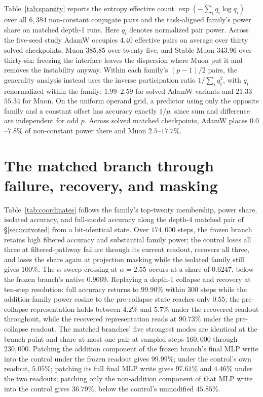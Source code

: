 Table~\ref{tab:sparsity} reports the entropy effective count $\exp(-\sum_i q_i\log q_i)$ over all $6{,}384$ non-constant conjugate pairs and the task-aligned family's power share on matched depth-1 runs. Here $q_i$ denotes normalized pair power. Across the five-seed study AdamW occupies $4.40$ effective pairs on average over thirty solved checkpoints, Muon $385.85$ over twenty-five, and Stable Muon $343.96$ over thirty-six: freezing the interface leaves the dispersion where Muon put it and removes the instability anyway. Within each family's $(p-1)/2$ pairs, the generality analysis instead uses the inverse participation ratio $1/\sum_i q_i^2$, with $q_i$ renormalized within the family: $1.99$--$2.59$ for solved AdamW variants and $21.33$--$55.34$ for Muon. On the uniform operand grid, a predictor using only the opposite family and a constant offset has accuracy exactly $1/p$, since sum and difference are independent for odd $p$. Across solved matched checkpoints, AdamW places $0.0$--$7.8\%$ of non-constant power there and Muon $2.5$--$17.7\%$.

\section{The matched branch through failure, recovery, and masking}
\label{app:branchtraj}



Table~\ref{tab:coordinates} follows the family's top-twenty membership, power share, isolated accuracy, and full-model accuracy along the depth-4 matched pair of \S\ref{sec:outvoted} from a bit-identical state. Over $174{,}000$ steps, the frozen branch retains high filtered accuracy and substantial family power; the control loses all three at filtered-pathway failure through its current readout, recovers all three, and loses the share again at projection masking while the isolated family still gives $100\%$. The $\alpha$-sweep crossing at $\alpha=2.55$ occurs at a share of $0.6247$, below the frozen branch's native $0.9069$. Replaying a depth-1 collapse and recovery at ten-step resolution: full accuracy returns to $99.90\%$ within $300$ steps while the addition-family power cosine to the pre-collapse state reaches only $0.55$; the pre-collapse representation holds between $4.2\%$ and $5.7\%$ under the recovered readout throughout, while the recovered representation reads at $90.73\%$ under the pre-collapse readout. The matched branches' five strongest modes are identical at the branch point and share at most one pair at sampled steps $160{,}000$ through $230{,}000$. Patching the addition component of the frozen branch's final MLP write into the control under the frozen readout gives $99.99\%$; under the control's own readout, $5.05\%$; patching its full final MLP write gives $97.61\%$ and $4.46\%$ under the two readouts; patching only the non-addition component of that MLP write into the control gives $36.79\%$, below the control's unmodified $45.85\%$.

